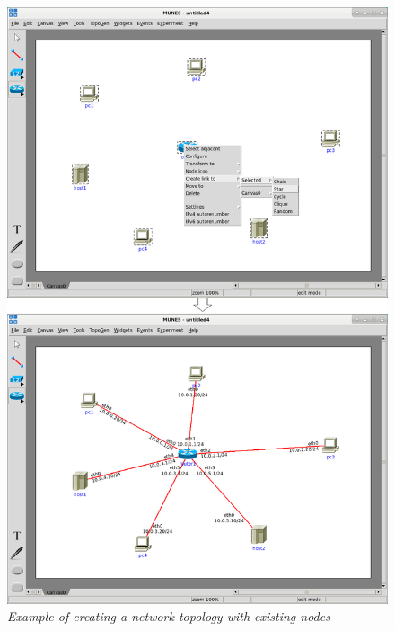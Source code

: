\begin{figure}[H]
\centering
\vspace{10pt}
\includegraphics[width=\textwidth]{./images/connect_1connect_2.png}
\caption{\emph{Example of creating a network topology with existing nodes}}
\label{fig:connect}
\end{figure}

